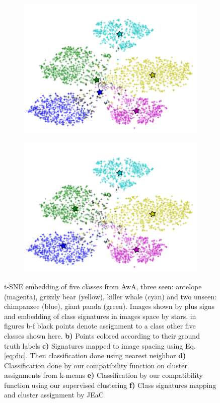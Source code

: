 \documentclass[10pt,twocolumn,letterpaper]{article}
\begin{document}
\begin{figure}[t]
\begin{subfigure}[b]{0.27\linewidth}
    \includegraphics[width=\linewidth]{figure_3}
    \caption{}
  \end{subfigure}
%
  \begin{subfigure}[b]{0.27\linewidth}
    \label{fig:joint}
    \includegraphics[width=\linewidth]{figure_4}
    \caption{}
  \end{subfigure}
  \caption{t-SNE embedding of five classes from AwA, three seen: antelope (magenta), grizzly bear (yellow), killer whale (cyan) and two
  unseen: chimpanzee (blue), giant panda (green). Images shown by plus signs and embedding of class signatures in images space by stars.
  in figures b-f black points denote assignment to a class other five classes shown here.
  \textbf{b)} Points colored according to their ground truth labels
  \textbf{c)} Signatures mapped to image spacing using Eq. \eqref{eq:dic}. Then classification done using nearest neighbor
  \textbf{d)} Classification done by our compatibility function on cluster assignments from k-means
  \textbf{e)} Classification by our compatibility function using our supervised clustering
  \textbf{f)} Class signatures mapping and cluster assignment by JEaC
  }
\end{figure}
\end{document}
